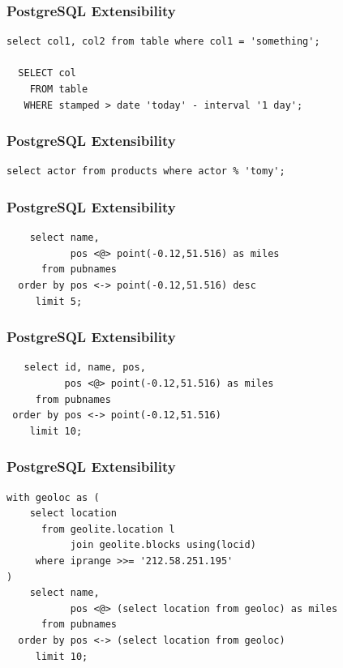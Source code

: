 \documentclass{beamer}
\begin{document}
\begin{frame}[fragile]
  \frametitle{PostgreSQL Extensibility}

\begin{verbatim}
select col1, col2 from table where col1 = 'something';

  SELECT col
    FROM table
   WHERE stamped > date 'today' - interval '1 day';

\end{verbatim}
\end{frame}

\begin{frame}[fragile]
  \frametitle{PostgreSQL Extensibility}

\begin{verbatim}
select actor from products where actor % 'tomy';
\end{verbatim}
\end{frame}

\begin{frame}[fragile]
  \frametitle{PostgreSQL Extensibility}

\begin{verbatim}
    select name,
           pos <@> point(-0.12,51.516) as miles
      from pubnames
  order by pos <-> point(-0.12,51.516) desc
     limit 5;
\end{verbatim}
\end{frame}

\begin{frame}[fragile]
  \frametitle{PostgreSQL Extensibility}

\begin{verbatim}
   select id, name, pos,
          pos <@> point(-0.12,51.516) as miles
     from pubnames
 order by pos <-> point(-0.12,51.516)
    limit 10;
\end{verbatim}
\end{frame}

\begin{frame}[fragile]
  \frametitle{PostgreSQL Extensibility}

\begin{verbatim}
with geoloc as (
    select location
      from geolite.location l
           join geolite.blocks using(locid)
     where iprange >>= '212.58.251.195'
)
    select name,
           pos <@> (select location from geoloc) as miles
      from pubnames
  order by pos <-> (select location from geoloc)
     limit 10;
\end{verbatim}
\end{frame}
\end{document}
